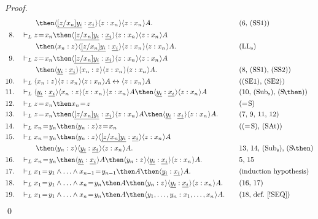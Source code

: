 \documentclass[11pt]{woarticle}
\theoremstyle{break}
\theoremstyle{nonumberplain}
\newcommand{\1}{\;\,|\;\,}
\renewcommand{\t}[1]{\ensuremath{\langle #1  \makebox[.2ex]{}\rangle}}
\renewcommand{\vec}[1]{\ensuremath{\underline{#1}}}
\newcommand{\T}[1]{\ensuremath{(\mathrm{ #1})}}
\begin{document}
\begin{proof}
\begin{alignat*}{2}
           & \quad\quad \then 
             \t{\vec{[z/x_n]y_i} : \vec{x_i}}\t{z:x_n}\t{z:x_n}A.
       && \text{(6, \T{SS1})}\\
    8.\quad& \vdash_L z\!=\!x_n \then
             \t{\vec{[z/x_n]y_i} : \vec{x_i}}\t{z:x_n}\t{z:x_n}A&&\\[-0.2ex]
           & \quad\quad \then 
             \t{x_n:z}\t{\vec{[z/x_n]y_i} : \vec{x_i}}\t{z:x_n}\t{z:x_n}A.
       && \text{\T{LL_s}}\\
    9.\quad& \vdash_L z\!=\!x_n \then
             \t{\vec{[z/x_n]y_i} : \vec{x_i}}\t{z:x_n}\t{z:x_n}A&&\\[-0.2ex]
           & \quad\quad \then 
             \t{\vec{y_i} : \vec{x_i}}\t{x_n:z}\t{z:x_n}\t{z:x_n}A.
       && \text{(8, \T{SS1}, \T{SS2})}\\
   10.\quad& \vdash_L \t{x_n:z}\t{z:x_n}\t{z:x_n}A \leftrightarrow \t{z:x_n}A 
       && \text{(\T{SE1}, \T{SE2})}\\
   11.\quad& \vdash_L \t{\vec{y_i} : \vec{x_i}}\t{x_n:z}\t{z:x_n}\t{z:x_n}A
             \then \t{\vec{y_i} : \vec{x_i}}\t{z:x_n}A
       && \text{(10, \T{Sub_s}, \T{S\!\then})}\\
   12.\quad& \vdash_L z\!=\!x_n \then x_n\!=\!z && \text{\T{=\!S}}\\
   13.\quad& \vdash_L z\!=\!x_n \then \t{\vec{[z/x_n]y_i} : \vec{x_i}}\t{z:x_n}A
            \then \t{\vec{y_i} : \vec{x_i}}\t{z:x_n}A.
       && \text{(7, 9, 11, 12)}\\
   14.\quad& \vdash_L x_n\!=\!y_n \then \t{y_n:z}z\!=\!x_n && \text{(\T{=\!S}, \T{SAt})}\\
   15.\quad& \vdash_L x_n\!=\!y_n \then \t{y_n:z} 
              \t{\vec{[z/x_n]y_i} : \vec{x_i}}\t{z:x_n}A &&\\[-0.2ex]
           & \quad\quad \then \t{y_n:z}\t{\vec{y_i} : \vec{x_i}}\t{z:x_n}A.
       && \text{13, 14, \T{Sub_s}, \T{S\!\then}}\\
   16.\quad& \vdash_L x_n\!=\!y_n \then \t{\vec{y_i} : \vec{x_i}}A
           \then \t{y_n:z}\t{\vec{y_i} : \vec{x_i}}\t{z:x_n}A.
       && \text{5, 15}\\
   17.\quad& \vdash_L x_1\!=\!y_1 \land \ldots \land x_{n-1}\!=\!y_{n-1} \then A
           \then \t{\vec{y_i} : \vec{x_i}}A.
      &\quad& \text{(induction hypothesis)}\\
   18.\quad& \vdash_L x_1\!=\!y_1 \land \ldots \land x_n\!=\!y_n \then A
            \then \t{y_n:z}\t{\vec{y_i} : \vec{x_i}}\t{z:x_n}A.
      &\quad& \text{(16, 17)}\\
   19.\quad& \vdash_L x_1\!=\!y_1 \land \ldots \land x_n\!=\!y_n \then A 
            \then \t{y_1,\ldots,y_{n} : x_1,\ldots,x_{n}}A.
      &\quad& \text{(18, def.~\ref{!SEQ})}
 \end{alignat*}
 \qed
\end{proof}
\end{document}
